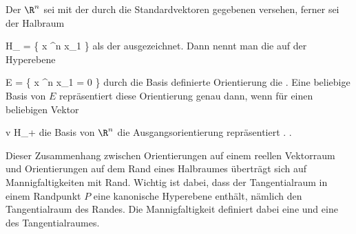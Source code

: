 
Der $\R^n$ sei mit der durch die Standardvektoren
 gegebenen
versehen, ferner sei der Halbraum

\mavergleichskettedisp
{\vergleichskette
{ H_{}
}
{ =} { \left\{  x \in \R^n   \mid   x_1          \right\}
}
{ } {
}
{ } {
}
{ } {
}
}
{}{}{}
als der  ausgezeichnet. Dann nennt man die auf der Hyperebene
 {} {}

\mavergleichskettedisp
{\vergleichskette
{ E
}
{ =} { \left\{  x \in \R^n   \mid   x_1 = 0         \right\}
}
{ } {
}
{ } {
}
{ } {
}
}
{}{}{}
durch die Basis
 definierte Orientierung die  {.} Eine beliebige Basis
 von $E$ repräsentiert diese Orientierung genau dann, wenn für einen beliebigen Vektor

\mavergleichskette
{\vergleichskette
{ v
}
{ \in }{ H_+
}
{  }{
}
{    }{
}
{   }{
}
}
{}{}{}
 {} {}
die Basis
 {} {}
von $\R^n$ die Ausgangsorientierung repräsentiert
 {.} {.}

Dieser Zusammenhang zwischen Orientierungen auf einem reellen Vektorraum und Orientierungen auf dem Rand eines Halbraumes überträgt sich auf Mannigfaltigkeiten mit Rand. Wichtig ist dabei, dass der Tangentialraum
 in einem Randpunkt $P$ eine kanonische Hyperebene enthält, nämlich den Tangentialraum
 des Randes. Die Mannigfaltigkeit definiert dabei eine  und eine  des Tangentialraumes.

